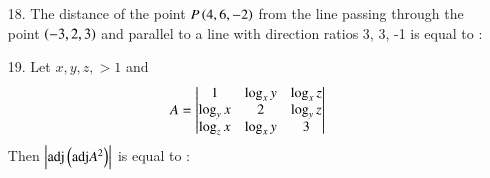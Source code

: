 \documentclass[journal,12pt,onecolumn]{IEEEtran}
\theoremstyle{remark}
\begin{document}
\begin{enumerate}
    \item[18.] The distance of the point $P\left(4, 6, -2\right)$ from the line passing through
        the point $\left(-3, 2, 3\right)$ and parallel to a line with direction ratios 3, 3, -1 is
        equal to :
        \hfill{}
        \begin{enumerate}
        \end{enumerate}
        \begin{figure}[ht]
            \centering
        \end{figure}
    \item[19.]  Let $x, y, z, > 1$ and   
        \begin{align}
            A = \begin{vmatrix}1 & \log_x y & \log_x z \\ \log_y x & 2 & \log_y z \\
            \log_z x & \log_x y & 3\end{vmatrix}
        \end{align} 
        Then $\left\vert\textnormal{adj}\left(\textnormal{adj}A^2\right)\right\vert$ is equal to :
        \hfill{}
        \begin{enumerate}
        \end{enumerate}


\end{enumerate}
\end{document}
